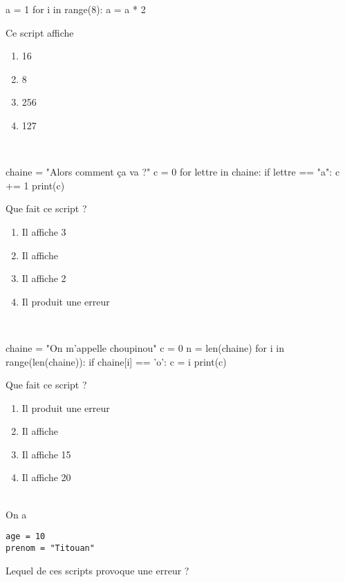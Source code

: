 \documentclass[a4paper,10pt]{article}
\begin{document}
\begin{pythoncode}
a = 1
for i in range(8):
    a = a * 2
\end{pythoncode}
Ce script affiche

\begin{enumerate}[\case\ ]
    \item 16
    \item 8
    \item 256
    \item 127
\end{enumerate}	
\ligne\\

\begin{pythoncode}
chaine = "Alors comment ça va ?"
c = 0
for lettre in chaine:
    if lettre == "a":
        c += 1
print(c)
\end{pythoncode}
Que fait ce script ?
\begin{enumerate}[\case\ ]
	\item 	Il affiche 3
	\item 	Il affiche 
    \item   Il affiche 2
    \item   Il produit une erreur
\end{enumerate}
\ligne\\

\begin{pythoncode}
chaine = "On m'appelle choupinou"
c = 0
n = len(chaine)
for i in range(len(chaine)):
    if chaine[i] == 'o':
        c = i
print(c)
\end{pythoncode}
Que fait ce script ?
\begin{enumerate}[\case\ ]
	\item 	Il produit une erreur
	\item 	Il affiche 
    \item   Il affiche 15
    \item   Il affiche 20
\end{enumerate}
\ligne\\

On a
\begin{verbatim}
age = 10
prenom = "Titouan"
\end{verbatim}
Lequel de ces scripts provoque une erreur ?
\end{document}
